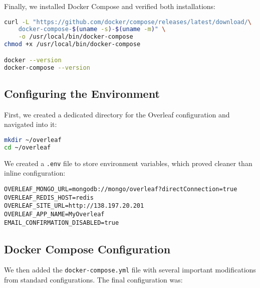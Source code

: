 Finally, we installed Docker Compose and verified both installations:

\begin{lstlisting}[language=bash]
curl -L "https://github.com/docker/compose/releases/latest/download/\
    docker-compose-$(uname -s)-$(uname -m)" \
    -o /usr/local/bin/docker-compose
chmod +x /usr/local/bin/docker-compose

docker --version
docker-compose --version
\end{lstlisting}

\subsection{Configuring the Environment}

First, we created a dedicated directory for the Overleaf configuration and navigated into it:

\begin{lstlisting}[language=bash]
mkdir ~/overleaf
cd ~/overleaf
\end{lstlisting}

We created a \texttt{.env} file to store environment variables, which proved cleaner than inline configuration:

\begin{lstlisting}
OVERLEAF_MONGO_URL=mongodb://mongo/overleaf?directConnection=true
OVERLEAF_REDIS_HOST=redis
OVERLEAF_SITE_URL=http://138.197.20.201
OVERLEAF_APP_NAME=MyOverleaf
EMAIL_CONFIRMATION_DISABLED=true
\end{lstlisting}

\subsection{Docker Compose Configuration}

We then added the \texttt{docker-compose.yml} file with several important modifications from standard configurations. The final configuration was:

